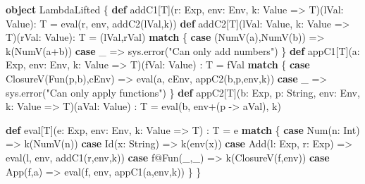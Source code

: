 \documentclass[]{article}
\newenvironment{Shaded}{}{}
\newcommand{\FunctionTok}[1]{\textcolor[rgb]{0.02,0.16,0.49}{#1}}
\newcommand{\KeywordTok}[1]{\textcolor[rgb]{0.00,0.44,0.13}{\textbf{#1}}}
\newcommand{\NormalTok}[1]{#1}
\newcommand{\StringTok}[1]{\textcolor[rgb]{0.25,0.44,0.63}{#1}}
\begin{document}
\begin{Shaded}
\begin{Highlighting}[]
\KeywordTok{object}\NormalTok{ LambdaLifted \{}
  \KeywordTok{def}\NormalTok{ addC1[T](r: Exp, env: Env, k: Value =\textgreater{} T)(lVal: Value): T =}
    \FunctionTok{eval}\NormalTok{(r, env, }\FunctionTok{addC2}\NormalTok{(lVal,k))}
  \KeywordTok{def}\NormalTok{ addC2[T](lVal: Value, k: Value =\textgreater{} T)(rVal: Value): T = (lVal,rVal) }\KeywordTok{match}\NormalTok{ \{}
      \KeywordTok{case}\NormalTok{ (}\FunctionTok{NumV}\NormalTok{(a),}\FunctionTok{NumV}\NormalTok{(b)) =\textgreater{} }\FunctionTok{k}\NormalTok{(}\FunctionTok{NumV}\NormalTok{(a+b))}
      \KeywordTok{case}\NormalTok{ \_ =\textgreater{} sys.}\FunctionTok{error}\NormalTok{(}\StringTok{"Can only add numbers"}\NormalTok{)}
\NormalTok{    \}}
  \KeywordTok{def}\NormalTok{ appC1[T](a: Exp, env: Env, k: Value =\textgreater{} T)(fVal: Value) : T  = fVal }\KeywordTok{match}\NormalTok{ \{}
      \KeywordTok{case} \FunctionTok{ClosureV}\NormalTok{(}\FunctionTok{Fun}\NormalTok{(p,b),cEnv) =\textgreater{} }\FunctionTok{eval}\NormalTok{(a, cEnv, }\FunctionTok{appC2}\NormalTok{(b,p,env,k))}
      \KeywordTok{case}\NormalTok{ \_ =\textgreater{} sys.}\FunctionTok{error}\NormalTok{(}\StringTok{"Can only apply functions"}\NormalTok{)}
\NormalTok{    \}}
  \KeywordTok{def}\NormalTok{ appC2[T](b: Exp, p: String, env: Env, k: Value =\textgreater{} T)(aVal: Value) : T =}
    \FunctionTok{eval}\NormalTok{(b, env+(p {-}\textgreater{} aVal), k)}

  \KeywordTok{def}\NormalTok{ eval[T](e: Exp, env: Env, k: Value =\textgreater{} T) : T = e }\KeywordTok{match}\NormalTok{ \{}
    \KeywordTok{case} \FunctionTok{Num}\NormalTok{(n: Int) =\textgreater{} }\FunctionTok{k}\NormalTok{(}\FunctionTok{NumV}\NormalTok{(n))}
    \KeywordTok{case} \FunctionTok{Id}\NormalTok{(x: String) =\textgreater{} }\FunctionTok{k}\NormalTok{(}\FunctionTok{env}\NormalTok{(x))}
    \KeywordTok{case} \FunctionTok{Add}\NormalTok{(l: Exp, r: Exp) =\textgreater{}}
      \FunctionTok{eval}\NormalTok{(l, env, }\FunctionTok{addC1}\NormalTok{(r,env,k))}
    \KeywordTok{case}\NormalTok{ f@}\FunctionTok{Fun}\NormalTok{(\_,\_) =\textgreater{} }\FunctionTok{k}\NormalTok{(}\FunctionTok{ClosureV}\NormalTok{(f,env))}
    \KeywordTok{case} \FunctionTok{App}\NormalTok{(f,a) =\textgreater{}}
      \FunctionTok{eval}\NormalTok{(f, env, }\FunctionTok{appC1}\NormalTok{(a,env,k))}
\NormalTok{  \}}
\NormalTok{\}}
\end{Highlighting}
\end{Shaded}
\end{document}
